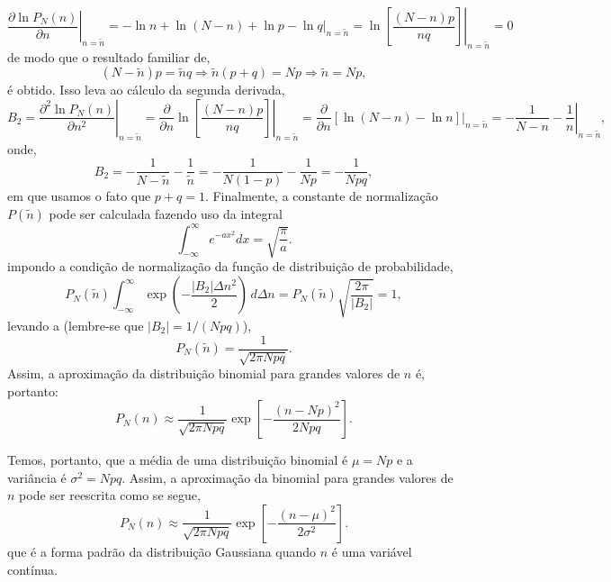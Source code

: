 \begin{equation*}
\left. \dfrac{\partial \ln P_N(n)}{\partial n} \right|_{n=\tilde{n}} = -\ln n + \ln (N - n) + \ln p - \ln q \bigg|_{n=\tilde{n}} = \left. \ln\left[\dfrac{(N - n)p}{nq}\right] \right|_{n=\tilde{n}} = 0
\end{equation*}
de modo que o resultado familiar de,
\begin{equation*}
(N - \tilde{n})p = \tilde{n} q \Rightarrow \tilde{n} (p + q) = Np \Rightarrow  \tilde{n} = Np,
\end{equation*}
é obtido. Isso leva ao cálculo da segunda derivada,
\begin{equation*}
B_2 = \left. \frac{\partial^2 \ln P_N(n)}{\partial n^2} \right|_{n=\tilde{n}} = \dfrac{\partial}{\partial n} \left.\ln\left[\dfrac{(N - n)p}{nq}\right] \right|_{n=\tilde{n}} = \dfrac{\partial}{\partial n} \left[\ln(N - n) - \ln n\right]\bigg|_{n=\tilde{n}} = \left. -\dfrac{1}{N - n} - \dfrac{1}{n} \right|_{n=\tilde{n}},
\end{equation*}
onde,
\begin{equation*}
B_2 = -\dfrac{1}{N - \tilde{n}} - \dfrac{1}{\tilde{n}} = -\dfrac{1}{N(1 - p)} - \dfrac{1}{Np} = -\dfrac{1}{Npq},
\end{equation*}
em que usamos o fato que $p + q = 1$. Finalmente, a constante de normalização $P(\tilde{n})$ pode ser calculada fazendo uso da integral
\begin{equation*}
\int_{-\infty}^{\infty} e^{-ax^2} dx = \sqrt{\dfrac{\pi}{a}}.
\end{equation*}
impondo a condição de normalização da função de distribuição de probabilidade,
\begin{equation*}
P_N(\tilde{n}) \int_{-\infty}^{\infty} \exp{\left(-\dfrac{|B_2| \Delta n^2}{2}\right)}\,d\Delta n = P_N(\tilde{n}) \sqrt{\dfrac{2\pi}{|B_2|}} = 1, 
\end{equation*}
levando a (lembre-se que $|B_2| = 1/(Npq)$),
\begin{equation*}
P_N(\tilde{n}) = \dfrac{1}{\sqrt{2\pi Npq}}.
\end{equation*}
Assim, a aproximação da distribuição binomial para grandes valores de $n$ é, portanto:
\begin{equation*}
P_N(n) \approx \dfrac{1}{\sqrt{2\pi Npq}}\exp\left[-\dfrac{(n - Np)^2}{2Npq}\right].
\end{equation*}

Temos, portanto, que a média de uma distribuição binomial é $\mu = Np$ e a variância é $\sigma^2 = Npq$. Assim, a aproximação da binomial para grandes valores de $n$ pode ser reescrita como se segue,
\begin{equation}
P_N(n) \approx \dfrac{1}{\sqrt{2\pi Npq}}\exp\left[-\dfrac{(n - \mu)^2}{2\sigma^2}\right].
\end{equation}
que é a forma padrão da distribuição Gaussiana quando $n$ é uma variável contínua.

